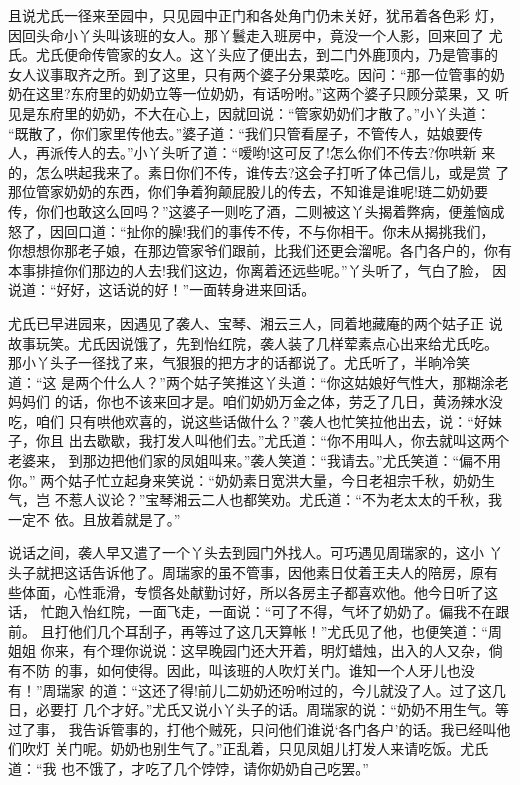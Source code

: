 且说尤氏一径来至园中，只见园中正门和各处角门仍未关好，犹吊着各色彩
灯，因回头命小丫头叫该班的女人。那丫鬟走入班房中，竟没一个人影，回来回了
尤氏。尤氏便命传管家的女人。这丫头应了便出去，到二门外鹿顶内，乃是管事的
女人议事取齐之所。到了这里，只有两个婆子分果菜吃。因问：“那一位管事的奶
奶在这里?东府里的奶奶立等一位奶奶，有话吩咐。”这两个婆子只顾分菜果，又
听见是东府里的奶奶，不大在心上，因就回说：“管家奶奶们才散了。”小丫头道：
“既散了，你们家里传他去。”婆子道：“我们只管看屋子，不管传人，姑娘要传
人，再派传人的去。”小丫头听了道：“嗳哟!这可反了!怎么你们不传去?你哄新
来的，怎么哄起我来了。素日你们不传，谁传去?这会子打听了体己信儿，或是赏
了那位管家奶奶的东西，你们争着狗颠屁股儿的传去，不知谁是谁呢!琏二奶奶要
传，你们也敢这么回吗？”这婆子一则吃了酒，二则被这丫头揭着弊病，便羞恼成
怒了，因回口道：“扯你的臊!我们的事传不传，不与你相干。你未从揭挑我们，
你想想你那老子娘，在那边管家爷们跟前，比我们还更会溜呢。各门各户的，你有
本事排揎你们那边的人去!我们这边，你离着还远些呢。”丫头听了，气白了脸，
因说道：“好好，这话说的好！”一面转身进来回话。

尤氏已早进园来，因遇见了袭人、宝琴、湘云三人，同着地藏庵的两个姑子正
说故事玩笑。尤氏因说饿了，先到怡红院，袭人装了几样荤素点心出来给尤氏吃。
那小丫头子一径找了来，气狠狠的把方才的话都说了。尤氏听了，半晌冷笑道：“这
是两个什么人？”两个姑子笑推这丫头道：“你这姑娘好气性大，那糊涂老妈妈们
的话，你也不该来回才是。咱们奶奶万金之体，劳乏了几日，黄汤辣水没吃，咱们
只有哄他欢喜的，说这些话做什么？”袭人也忙笑拉他出去，说：“好妹子，你且
出去歇歇，我打发人叫他们去。”尤氏道：“你不用叫人，你去就叫这两个老婆来，
到那边把他们家的凤姐叫来。”袭人笑道：“我请去。”尤氏笑道：“偏不用你。”
两个姑子忙立起身来笑说：“奶奶素日宽洪大量，今日老祖宗千秋，奶奶生气，岂
不惹人议论？”宝琴湘云二人也都笑劝。尤氏道：“不为老太太的千秋，我一定不
依。且放着就是了。”

说话之间，袭人早又遣了一个丫头去到园门外找人。可巧遇见周瑞家的，这小
丫头子就把这话告诉他了。周瑞家的虽不管事，因他素日仗着王夫人的陪房，原有
些体面，心性乖滑，专惯各处献勤讨好，所以各房主子都喜欢他。他今日听了这话，
忙跑入怡红院，一面飞走，一面说：“可了不得，气坏了奶奶了。偏我不在跟前。
且打他们几个耳刮子，再等过了这几天算帐！”尤氏见了他，也便笑道：“周姐姐
你来，有个理你说说：这早晚园门还大开着，明灯蜡烛，出入的人又杂，倘有不防
的事，如何使得。因此，叫该班的人吹灯关门。谁知一个人牙儿也没有！”周瑞家
的道：“这还了得!前儿二奶奶还吩咐过的，今儿就没了人。过了这几日，必要打
几个才好。”尤氏又说小丫头子的话。周瑞家的说：“奶奶不用生气。等过了事，
我告诉管事的，打他个贼死，只问他们谁说‘各门各户’的话。我已经叫他们吹灯
关门呢。奶奶也别生气了。”正乱着，只见凤姐儿打发人来请吃饭。尤氏道：“我
也不饿了，才吃了几个饽饽，请你奶奶自己吃罢。”


